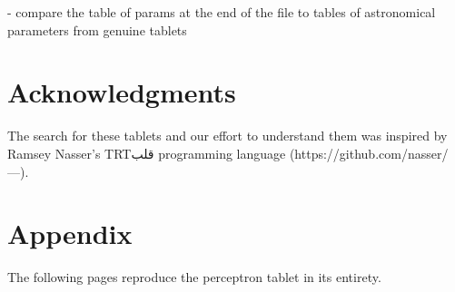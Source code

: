 \documentclass[11pt]{article}
\newcommand{\textarabic}[1]     %
    {\bgroup\textdir TRT\arabicfont #1\egroup}
\begin{document}
- compare the table of params at the end of the file to tables of astronomical parameters from genuine tablets


\section*{Acknowledgments}
The search for these tablets and our effort to understand them was inspired by Ramsey Nasser's \textarabic{قلب} programming language (https://github.com/nasser/---).



\appendix

\section{Appendix}
\label{sec:appendix}

The following pages reproduce the perceptron tablet in its entirety.

\onecolumn
\tiny
\noindent

\normalsize
\end{document}
